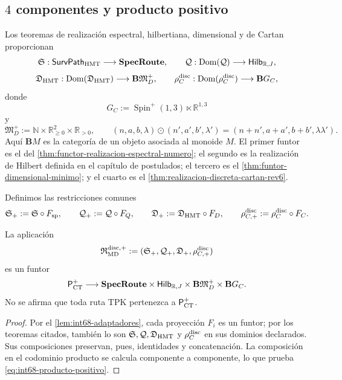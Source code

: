 \subsection{\(4\) componentes y producto positivo}

Los teoremas de realización espectral, hilbertiana, dimensional y de Cartan
proporcionan
\[
 \mathfrak S:\mathsf{SurvPath}_{\rm HMT}
      \longrightarrow\mathbf{SpecRoute},
 \qquad
 \mathcal Q:\operatorname{Dom}(\mathcal Q)
      \longrightarrow\mathsf{Hilb}_{\mathbb R,J},
\]
\[
 \mathfrak D_{\rm HMT}:\operatorname{Dom}(\mathfrak D_{\rm HMT})
      \longrightarrow\mathbf B\mathfrak M_D^+,
 \qquad
 \rho_C^{\rm disc}:\operatorname{Dom}(\rho_C^{\rm disc})
      \longrightarrow\mathbf B G_C,
\]
donde
\[
 G_C:=\operatorname{Spin}^{+}(1,3)\ltimes\mathbb R^{1,3}
\]
y
\begin{equation}
 \mathfrak M_D^+
 :=\mathbb N\times\mathbb R_{\geq0}^{2}\times\mathbb R_{>0},
 \qquad
 (n,a,b,\lambda)\odot(n',a',b',\lambda')
 =(n+n',a+a',b+b',\lambda\lambda').
 \label{eq:int68-monoide-dimensional-positivo}
\end{equation}
Aquí \(\mathbf BM\) es la categoría de un objeto asociada al monoide
\(M\). El primer funtor es el del
\cref{thm:functor-realizacion-espectral-numero}; el segundo es la
realización de Hilbert definida en el capítulo de postulados; el tercero es
el \cref{thm:funtor-dimensional-minimo}; y el cuarto es el
\cref{thm:realizacion-discreta-cartan-rev6}.

Definimos las restricciones comunes
\[
 \mathfrak S_+:=\mathfrak S\circ F_{\rm sp},\qquad
 \mathcal Q_+:=\mathcal Q\circ F_Q,\qquad
 \mathfrak D_+:=\mathfrak D_{\rm HMT}\circ F_D,\qquad
 \rho_{C,+}^{\rm disc}:=\rho_C^{\rm disc}\circ F_C.
\]

\begin{theorem}
\label{thm:int68-producto-positivo}
La aplicación
\begin{equation}
 \mathfrak R_{\rm MD}^{\rm disc,+}
 :=(\mathfrak S_+,\mathcal Q_+,\mathfrak D_+,
       \rho_{C,+}^{\rm disc})
 \label{eq:int68-producto-positivo}
\end{equation}
es un funtor
\[
 \mathsf P_{\rm CT}^{+}\longrightarrow
 \mathbf{SpecRoute}\times\mathsf{Hilb}_{\mathbb R,J}
 \times\mathbf B\mathfrak M_D^+\times\mathbf BG_C.
\]
No se afirma que toda ruta TPK pertenezca a \(\mathsf P_{\rm CT}^{+}\).
\end{theorem}

\begin{proof}
Por el \cref{lem:int68-adaptadores}, cada proyección \(F_i\) es un funtor;
por los teoremas citados, también lo son
\(\mathfrak S,\mathcal Q,\mathfrak D_{\rm HMT}\) y
\(\rho_C^{\rm disc}\) en sus dominios declarados. Sus composiciones
preservan, pues, identidades y concatenación. La composición en el codominio
producto se calcula componente a componente, lo que prueba
\eqref{eq:int68-producto-positivo}.
\end{proof}

